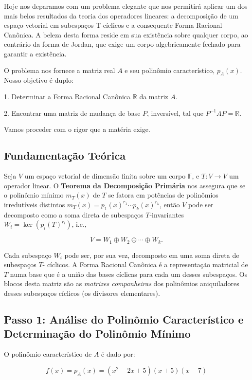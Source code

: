 Hoje nos deparamos com um problema elegante que nos permitirá aplicar um dos mais belos
resultados da teoria dos operadores lineares: a decomposição de um espaço vetorial em subespaços
T-cíclicos e a consequente Forma Racional Canônica. A beleza desta forma reside em sua existência
sobre qualquer corpo, ao contrário da forma de Jordan, que exige um corpo algebricamente fechado
para garantir a existência.

O problema nos fornece a matriz real $A$ e seu polinômio característico, $p_A(x)$. Nosso objetivo é
duplo:

1. Determinar a Forma Racional Canônica $\mathbb{R}$ da matriz $A$.

2. Encontrar uma matriz de mudança de base $P$, inversível, tal que $P^{-1}AP = \mathbb{R}$.

Vamos proceder com o rigor que a matéria exige.

\subsection*{Fundamentação Teórica}

Seja $V$ um espaço vetorial de dimensão finita sobre um corpo $\mathbb{F}$, e $T: V \to V$ um operador linear.
O \textbf{Teorema da Decomposição Primária} nos assegura que se o polinômio mínimo $m_T(x)$ de $T$ se
fatora em potências de polinômios irredutíveis distintos $m_T(x) = p_1(x)^{r_1}\cdots p_k(x)^{r_k}$, então $V$
pode ser decomposto como a soma direta de subespaços $T$-invariantes $W_i = \ker(p_i(T)^{r_i})$, i.e.,

\[
V = W_1 \oplus W_2 \oplus \cdots \oplus W_k.
\]

Cada subespaço $W_i$ pode ser, por sua vez, decomposto em uma soma direta de subespaços $T$-
cíclicos. A Forma Racional Canônica é a representação matricial de $T$ numa base que é a união das
bases cíclicas para cada um desses subespaços. Os blocos desta matriz são as \textit{matrizes
companheiras} dos polinômios aniquiladores desses subespaços cíclicos (os divisores elementares).

\subsection*{Passo 1: Análise do Polinômio Característico e Determinação do Polinômio Mínimo}

O polinômio característico de $A$ é dado por:

\[
f(x) = p_A(x) = (x^2 - 2x + 5)(x+5)(x-7)
\]

